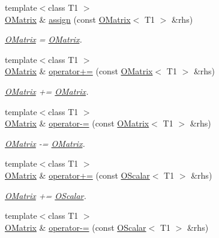 \begin{DoxyCompactItemize}
{\footnotesize template$<$class T1 $>$ }\\\mbox{\hyperlink{classENSEM_1_1OMatrix}{O\+Matrix}} \& \mbox{\hyperlink{classENSEM_1_1OMatrix_a37ed216c9ecfe42f7a357573699b3bfc}{assign}} (const \mbox{\hyperlink{classENSEM_1_1OMatrix}{O\+Matrix}}$<$ T1 $>$ \&rhs)
\begin{DoxyCompactList}\small\item\em \mbox{\hyperlink{classENSEM_1_1OMatrix}{O\+Matrix}} = \mbox{\hyperlink{classENSEM_1_1OMatrix}{O\+Matrix}}. \end{DoxyCompactList}\item 
{\footnotesize template$<$class T1 $>$ }\\\mbox{\hyperlink{classENSEM_1_1OMatrix}{O\+Matrix}} \& \mbox{\hyperlink{classENSEM_1_1OMatrix_a221eb5f9e17402ad93c829fcaf2ac60a}{operator+=}} (const \mbox{\hyperlink{classENSEM_1_1OMatrix}{O\+Matrix}}$<$ T1 $>$ \&rhs)
\begin{DoxyCompactList}\small\item\em \mbox{\hyperlink{classENSEM_1_1OMatrix}{O\+Matrix}} += \mbox{\hyperlink{classENSEM_1_1OMatrix}{O\+Matrix}}. \end{DoxyCompactList}\item 
{\footnotesize template$<$class T1 $>$ }\\\mbox{\hyperlink{classENSEM_1_1OMatrix}{O\+Matrix}} \& \mbox{\hyperlink{classENSEM_1_1OMatrix_a4c9bcdd861f4439d1b165ec5285cf55f}{operator-\/=}} (const \mbox{\hyperlink{classENSEM_1_1OMatrix}{O\+Matrix}}$<$ T1 $>$ \&rhs)
\begin{DoxyCompactList}\small\item\em \mbox{\hyperlink{classENSEM_1_1OMatrix}{O\+Matrix}} -\/= \mbox{\hyperlink{classENSEM_1_1OMatrix}{O\+Matrix}}. \end{DoxyCompactList}\item 
{\footnotesize template$<$class T1 $>$ }\\\mbox{\hyperlink{classENSEM_1_1OMatrix}{O\+Matrix}} \& \mbox{\hyperlink{classENSEM_1_1OMatrix_ab488697fd72f3891fede3d00f8deb019}{operator+=}} (const \mbox{\hyperlink{classENSEM_1_1OScalar}{O\+Scalar}}$<$ T1 $>$ \&rhs)
\begin{DoxyCompactList}\small\item\em \mbox{\hyperlink{classENSEM_1_1OMatrix}{O\+Matrix}} += \mbox{\hyperlink{classENSEM_1_1OScalar}{O\+Scalar}}. \end{DoxyCompactList}\item 
{\footnotesize template$<$class T1 $>$ }\\\mbox{\hyperlink{classENSEM_1_1OMatrix}{O\+Matrix}} \& \mbox{\hyperlink{classENSEM_1_1OMatrix_a53a1a690a2f39f0c64c6d261efc00e4c}{operator-\/=}} (const \mbox{\hyperlink{classENSEM_1_1OScalar}{O\+Scalar}}$<$ T1 $>$ \&rhs)

\end{DoxyCompactItemize}
